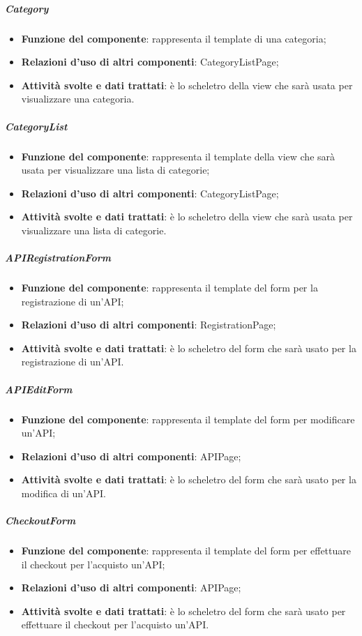 \subparagraph{Category}
\begin{itemize}
	\item \textbf{Funzione del componente}: rappresenta il template di una categoria;
	\item \textbf{Relazioni d’uso di altri componenti}: CategoryListPage;
	\item \textbf{Attività svolte e dati trattati}: \`{e} lo scheletro della view che sar\`{a} usata per visualizzare una categoria.
\end{itemize}

\subparagraph{CategoryList}
\begin{itemize}
	\item \textbf{Funzione del componente}: rappresenta il template della view che sar\`{a} usata per visualizzare una lista di categorie;
	\item \textbf{Relazioni d’uso di altri componenti}: CategoryListPage;
	\item \textbf{Attività svolte e dati trattati}: \`{e} lo scheletro della view che sar\`{a} usata per visualizzare una lista di categorie.
\end{itemize}

\subparagraph{APIRegistrationForm}
\begin{itemize}
	\item \textbf{Funzione del componente}: rappresenta il template del form per la registrazione di un'API;
	\item \textbf{Relazioni d’uso di altri componenti}: RegistrationPage;
	\item \textbf{Attività svolte e dati trattati}: \`{e} lo scheletro del form che sar\`{a} usato per la registrazione di un'API.
\end{itemize}

\subparagraph{APIEditForm}
\begin{itemize}
	\item \textbf{Funzione del componente}: rappresenta il template del form per modificare un'API;
	\item \textbf{Relazioni d’uso di altri componenti}: APIPage;
	\item \textbf{Attività svolte e dati trattati}: \`{e} lo scheletro del form che sar\`{a} usato per la modifica di un'API.
\end{itemize}

\subparagraph{CheckoutForm}
\begin{itemize}
	\item \textbf{Funzione del componente}: rappresenta il template del form per effettuare il checkout per l'acquisto un'API;
	\item \textbf{Relazioni d’uso di altri componenti}: APIPage;
	\item \textbf{Attività svolte e dati trattati}: \`{e} lo scheletro del form che sar\`{a} usato per effettuare il checkout per l'acquisto un'API.
\end{itemize}

